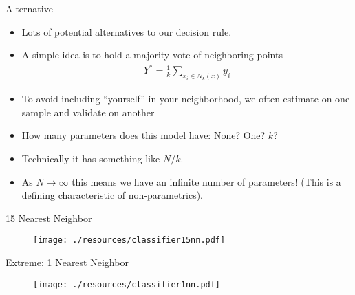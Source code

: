 \documentclass[11pt,handout,xcolor=pdftex,dvipsnames,table,mathserif,aspectratio=169]{beamer}
\begin{document}
\begin{frame}{Alternative}
\begin{itemize}
\item Lots of potential alternatives to our decision rule.
\item A simple idea is to hold a majority vote of neighboring points 
\begin{eqnarray*}
Y^{*} = \frac{1}{k} \sum_{x_i \in N_k(x)} y_i
\end{eqnarray*}
\item To avoid including ``yourself'' in your neighborhood, we often estimate on one sample and validate on another
\item How many parameters does this model have: None? One? $k$? 
\item Technically it has something like $N/k$.
\item As $N \rightarrow \infty$ this means we have an infinite number of parameters! (This is a defining characteristic of non-parametrics).
\end{itemize}
\end{frame}


\begin{frame}{15 Nearest Neighbor}
\begin{figure}[htbp]
\begin{center}
\texttt{[image: ./resources/classifier15nn.pdf]}
\label{class15nn}
\end{center}
\end{figure}
\end{frame}

\begin{frame}{Extreme: 1 Nearest Neighbor}
\begin{figure}[htbp]
\begin{center}
\texttt{[image: ./resources/classifier1nn.pdf]}
\label{class15nn}
\end{center}
\end{figure}
\end{frame}
\end{document}
